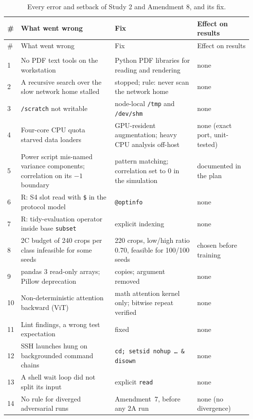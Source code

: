 {\small
\begin{longtable}{p{}p{}p{}p{}}
\caption{Every error and setback of Study 2 and Amendment 8, and its fix.}\label{r:tab:errors}\\
\toprule
\# & What went wrong & Fix & Effect on results \\
\midrule
\endfirsthead
\toprule
\# & What went wrong & Fix & Effect on results \\
\midrule
\endhead
\bottomrule
\endfoot
\multicolumn{4}{l}{\textbf{Study 2 preparation (before registration)}} \\
1 & No PDF text tools on the workstation & Python PDF libraries for reading and rendering & none \\
2 & A recursive search over the slow network home stalled & stopped; rule: never scan the network home & none \\
3 & \texttt{/scratch} not writable & node-local \texttt{/tmp} and \texttt{/dev/shm} & none \\
4 & Four-core CPU quota starved data loaders & GPU-resident augmentation; heavy CPU analysis off-host & none (exact port, unit-tested) \\
5 & Power script mis-named variance components; correlation on its $-1$ boundary & pattern matching; correlation set to 0 in the simulation & documented in the plan \\
6 & R: S4 slot read with \texttt{\$} in the protocol model & \texttt{@optinfo} & none \\
7 & R: tidy-evaluation operator inside base \texttt{subset} & explicit indexing & none \\
8 & 2C budget of 240 crops per class infeasible for some seeds & 220 crops, low/high ratio 0.70, feasible for 100/100 seeds & chosen before training \\
9 & pandas 3 read-only arrays; Pillow deprecation & copies; argument removed & none \\
10 & Non-deterministic attention backward (ViT) & math attention kernel only; bitwise repeat verified & none \\
11 & Lint findings, a wrong test expectation & fixed & none \\
12 & SSH launches hung on backgrounded command chains & \texttt{cd; setsid nohup \ldots\ \& disown} & none \\
13 & A shell wait loop did not split its input & explicit \texttt{read} & none \\
14 & No rule for diverged adversarial runs & Amendment~7, before any 2A run & none (no divergence) \\

\end{longtable}}
